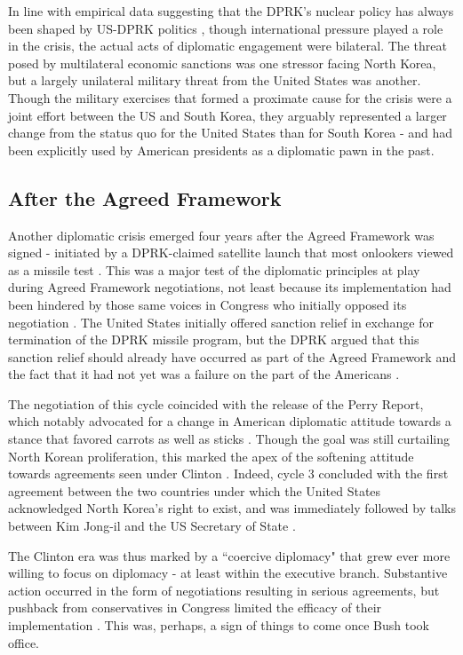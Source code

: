 In line with empirical data suggesting that the DPRK's nuclear policy has always been shaped by US-DPRK politics \cite{rich14}, though international pressure played a role in the crisis, the actual acts of diplomatic engagement were bilateral. The threat posed by multilateral economic sanctions was one stressor facing North Korea, but a largely unilateral military threat from the United States was another. Though the military exercises that formed a proximate cause for the crisis were a joint effort between the US and South Korea, they arguably represented a larger change from the status quo for the United States than for South Korea - and had been explicitly used by American presidents as a diplomatic pawn in the past.

\subsection{After the Agreed Framework}

Another diplomatic crisis emerged four years after the Agreed Framework was signed - initiated by a DPRK-claimed satellite launch that most onlookers viewed as a missile test \cite{orfall}. This was a major test of the diplomatic principles at play during Agreed Framework negotiations, not least because its implementation had been hindered by those same voices in Congress who initially opposed its negotiation \cite{hecker2}. The United States initially offered sanction relief in exchange for termination of the DPRK missile program, but the DPRK argued that this sanction relief should already have occurred as part of the Agreed Framework and the fact that it had not yet was a failure on the part of the Americans \cite{davenport}.

The negotiation of this cycle coincided with the release of the Perry Report, which notably advocated for a change in American diplomatic attitude towards a stance that favored carrots as well as sticks \cite{perry}. Though the goal was still curtailing North Korean proliferation, this marked the apex of the softening attitude towards agreements seen under Clinton \cite{bleiker}. Indeed, cycle 3 concluded with the first agreement between the two countries under which the United States acknowledged North Korea's right to exist, and was immediately followed by talks between Kim Jong-il and the US Secretary of State \cite{hecker2}.
			
The Clinton era was thus marked by a ``coercive diplomacy" that grew ever more willing to focus on diplomacy - at least within the executive branch. Substantive action occurred in the form of negotiations resulting in serious agreements, but pushback from conservatives in Congress limited the efficacy of their implementation \cite{harnisch}. This was, perhaps, a sign of things to come once Bush took office.
	
